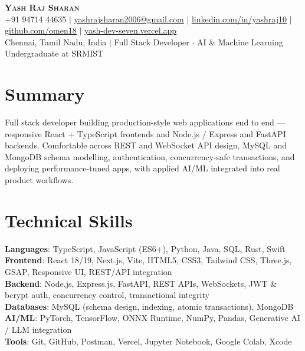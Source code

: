 \documentclass[letterpaper,11pt]{article}
\begin{document}
\begin{center}
    \textbf{\Huge \scshape Yash Raj Sharan} \\ \vspace{4pt}
    \small +91 94714 44635 $|$ \href{mailto:yashrajsharan2006@gmail.com}{\underline{yashrajsharan2006@gmail.com}} $|$ 
    \href{https://linkedin.com/in/yashraj10}{\underline{linkedin.com/in/yashraj10}} $|$
    \href{https://github.com/omen18}{\underline{github.com/omen18}} $|$
    \href{https://yash-dev-seven.vercel.app}{\underline{yash-dev-seven.vercel.app}} \\
    \vspace{2pt}
    \small Chennai, Tamil Nadu, India $|$ Full Stack Developer $\cdot$ AI \& Machine Learning Undergraduate at SRMIST
\end{center}

\section{Summary}
\small{
Full stack developer building production-style web applications end to end --- responsive React + TypeScript frontends and Node.js / Express and FastAPI backends. Comfortable across REST and WebSocket API design, MySQL and MongoDB schema modelling, authentication, concurrency-safe transactions, and deploying performance-tuned apps, with applied AI/ML integrated into real product workflows.
}

\section{Technical Skills}
 \begin{itemize}[leftmargin=0.15in, label={}]
    \small{\item{
     \textbf{Languages}{: TypeScript, JavaScript (ES6+), Python, Java, SQL, Rust, Swift} \\
     \textbf{Frontend}{: React 18/19, Next.js, Vite, HTML5, CSS3, Tailwind CSS, Three.js, GSAP, Responsive UI, REST/API integration} \\
     \textbf{Backend}{: Node.js, Express.js, FastAPI, REST APIs, WebSockets, JWT \& bcrypt auth, concurrency control, transactional integrity} \\
     \textbf{Databases}{: MySQL (schema design, indexing, atomic transactions), MongoDB} \\
     \textbf{AI/ML}{: PyTorch, TensorFlow, ONNX Runtime, NumPy, Pandas, Generative AI / LLM integration} \\
     \textbf{Tools}{: Git, GitHub, Postman, Vercel, Jupyter Notebook, Google Colab, Xcode}
    }}
 \end{itemize}
\end{document}
